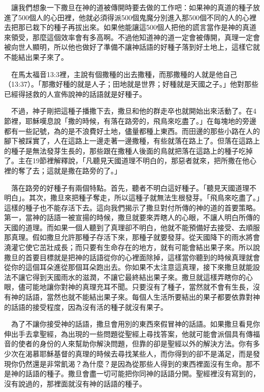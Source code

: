 \documentclass{book}
\begin{document}
　讓我們想象一下撒旦在神的道被傳開時要去做的工作吧：如果神的真道的種子放進了500個人的心田裡，他就必須得派500個鬼魔分別進入那500個不同的人的心裡去把那已栽下的種子再拔出來。如果他能讓這500個人把他的謊言當作是神的真道來領受，那麼這個效率會有多高啊。不過他知道神的道一定會被傳開，真理一定會被向世人顯明，所以他也做好了準備不讓神話語的好種子落到好土地上，這樣它就不能結出果子來了。

　在馬太福音13:3裡，主說有個撒種的出去撒種，而那撒種的人就是他自己（13:37）。「那撒好種的就是人子；田地就是世界；好種就是天國之子。」他對那些已經得拯救的人宣佈說神的話語就是好種子。

　不過，神子剛把這種子播撒下去，撒旦和他的群走卒也就開始出來活動了。在4節裡，耶穌嘆息說「撒的時候，有落在路旁的，飛鳥來吃盡了。」在每塊地的旁邊都有一些記號，為的是不浪費好土地，儘量都種上東西。而田邊的那些小路在人的腳下被踩實了，人在這路上一邊走著一邊撒種，有些就落在路上了。但落在這路上的種子是無法發芽生長的，那些跟在撒種人後面的鳥就把落在這路上的種子吃掉了。主在19節裡解釋說，「凡聽見天國道理不明白的，那惡者就來，把所撒在他心裡的奪了去；這就是撒在路旁的了。」

　落在路旁的好種子有兩個特點。首先，聽者不明白這好種子。「聽見天國道理不明白」。其次，撒旦來把種子奪走，所以這種子就無法生根發芽。「飛鳥來吃盡了。」這樣的種子也不能存活下去。這向我們揭示了撒旦對付所傳的神的道的首要策略。第一，當神的話語一被宣揚的時候，撒旦就要來弄瞎人的心眼，不讓人明白所傳的天國的道理。而如果一個人聽到了真理卻不明白，他就不能預備好去接受、去順服那真理。假如撒旦允許那種子存活下來，那種子就要發芽。從天國降下的雨水將會澆灌它使它茁壯成長；而只要有生命存在的地方，就有可能會結出果子來。所以說撒旦的首要目標就是把神的話語從你的心裡面除掉，這樣當你聽到的時候真理就會從你的這個耳朵進從那個耳朵跑出去。你如果不太注意這真理，接下來撒旦就能設法不讓它得到天國雨水的滋潤，不讓它最終結出果子來。撒旦就這樣弄瞎你的心眼，儘可能地讓你對神的真理充耳不聞。只要沒有了種子，當然就不會有生長，沒有神的話語，當然也就不能結出果子來。每個人生活所要結出的果子都要依靠對神的話語的接受程度，因為沒有活的種子就沒有果子。

　為了不讓你接受神的話語，撒旦會用別的東西來假冒神的話語。如果撒旦看見你伸出手去拿聖經，為出現的一些問題從聖經上尋找答案，他就可能會派個具有傳福音的使者的身份的人來幫助你解決問題，但靠的卻是聖經以外的解決方法。你有多少次在渴慕耶穌基督的真理的時候去尋找某些人，而你得到的卻不是滿足，而是發現你仍然還是非常飢渴？為什麼？是因為從那些人得到的東西裡面沒有生命。那不是神的話語的種子。撒旦會盡一切可能把你同神的話語分開。聖經裡沒有寫到的，沒有說過的，那裡面就沒有神的話語的種子。
\end{document}
